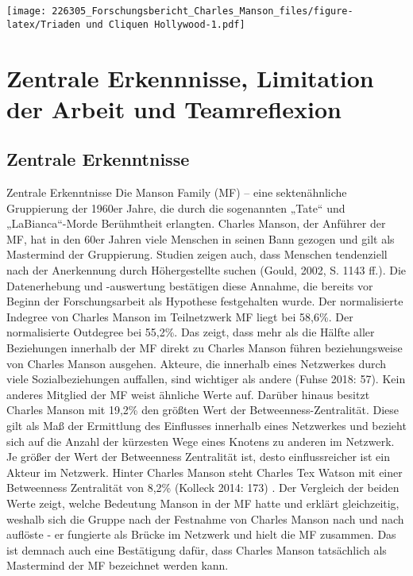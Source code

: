 \documentclass[
]{article}
\begin{document}
\texttt{[image: 226305\_Forschungsbericht\_Charles\_Manson\_files/figure-latex/Triaden und Cliquen Hollywood-1.pdf]}

\hypertarget{zentrale-erkennnisse-limitation-der-arbeit-und-teamreflexion}{%
\section{Zentrale Erkennnisse, Limitation der Arbeit und
Teamreflexion}\label{zentrale-erkennnisse-limitation-der-arbeit-und-teamreflexion}}

\hypertarget{zentrale-erkenntnisse}{%
\subsection{Zentrale Erkenntnisse}\label{zentrale-erkenntnisse}}

Zentrale Erkenntnisse Die Manson Family (MF) -- eine sektenähnliche
Gruppierung der 1960er Jahre, die durch die sogenannten „Tate`` und
„LaBianca``-Morde Berühmtheit erlangten. Charles Manson, der Anführer
der MF, hat in den 60er Jahren viele Menschen in seinen Bann gezogen und
gilt als Mastermind der Gruppierung. Studien zeigen auch, dass Menschen
tendenziell nach der Anerkennung durch Höhergestellte suchen (Gould,
2002, S. 1143 ff.). Die Datenerhebung und -auswertung bestätigen diese
Annahme, die bereits vor Beginn der Forschungsarbeit als Hypothese
festgehalten wurde. Der normalisierte Indegree von Charles Manson im
Teilnetzwerk MF liegt bei 58,6\%. Der normalisierte Outdegree bei
55,2\%. Das zeigt, dass mehr als die Hälfte aller Beziehungen innerhalb
der MF direkt zu Charles Manson führen beziehungsweise von Charles
Manson ausgehen. Akteure, die innerhalb eines Netzwerkes durch viele
Sozialbeziehungen auffallen, sind wichtiger als andere (Fuhse 2018: 57).
Kein anderes Mitglied der MF weist ähnliche Werte auf. Darüber hinaus
besitzt Charles Manson mit 19,2\% den größten Wert der
Betweenness-Zentralität. Diese gilt als Maß der Ermittlung des
Einflusses innerhalb eines Netzwerkes und bezieht sich auf die Anzahl
der kürzesten Wege eines Knotens zu anderen im Netzwerk. Je größer der
Wert der Betweenness Zentralität ist, desto einflussreicher ist ein
Akteur im Netzwerk. Hinter Charles Manson steht Charles Tex Watson mit
einer Betweenness Zentralität von 8,2\% (Kolleck 2014: 173) . Der
Vergleich der beiden Werte zeigt, welche Bedeutung Manson in der MF
hatte und erklärt gleichzeitig, weshalb sich die Gruppe nach der
Festnahme von Charles Manson nach und nach auflöste - er fungierte als
Brücke im Netzwerk und hielt die MF zusammen. Das ist demnach auch eine
Bestätigung dafür, dass Charles Manson tatsächlich als Mastermind der MF
bezeichnet werden kann.
\end{document}
